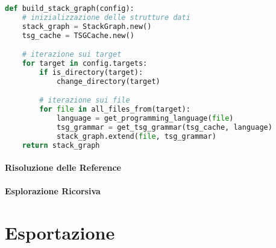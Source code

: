 \begin{lstlisting}[language=Python, caption=pseudocodice]
def build_stack_graph(config):
    # inizializzazione delle strutture dati
    stack_graph = StackGraph.new()
    tsg_cache = TSGCache.new()

    # iterazione sui target
    for target in config.targets:
        if is_directory(target):
            change_directory(target)

        # iterazione sui file
        for file in all_files_from(target):
            language = get_programming_language(file)
            tsg_grammar = get_tsg_grammar(tsg_cache, language)
            stack_graph.extend(file, tsg_grammar)
    return stack_graph
\end{lstlisting}

\paragraph{Risoluzione delle Reference}


\paragraph{Esplorazione Ricorsiva}


\section{Esportazione}

